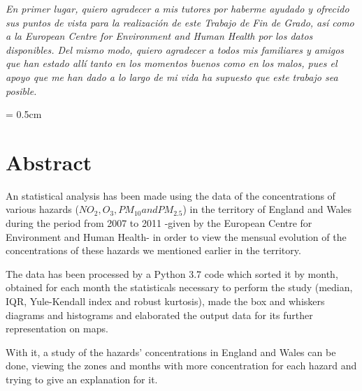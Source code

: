 \documentclass[12pt]{article}
\begin{document}
\newpage
\vspace{10cm}
\newpage

\begin{minipage}[]{20cm}
\vspace{10cm}
\end{minipage}


\begin{flushright}
\normalsize \textit{En primer lugar, quiero agradecer a mis tutores por haberme ayudado y ofrecido sus puntos de vista para la realización de este Trabajo de Fin de Grado, así como a la European Centre for Environment and Human Health por los datos disponibles. Del mismo modo, quiero agradecer a todos mis familiares y amigos que han estado allí tanto en los momentos buenos como en los malos, pues el apoyo que me han dado a lo largo de mi vida ha supuesto que este trabajo sea posible.}
\end{flushright}

\parskip = 0.5cm
\newpage
\tableofcontents
\newpage
{}	%
\setcounter{page}{1}

\section*{Abstract}
%

\normalsize An statistical analysis has been made using the data of the concentrations of various hazards ($NO_2, O_3, PM_{10} and PM_{2.5}$) in the territory of England and Wales during the period from 2007 to 2011 -given by the European Centre for Environment and Human Health- in order to view the mensual evolution of the concentrations of these hazards we mentioned earlier in the territory.

The data has been processed by a Python 3.7 code which sorted it by month, obtained for each month the statisticals necessary to perform the study (median, IQR, Yule-Kendall index and robust kurtosis), made the box and whiskers diagrams and histograms and elaborated the output data for its further representation on maps.

With it, a study of the hazards' concentrations in England and Wales can be done, viewing the zones and months with more concentration for each hazard and trying to give an explanation for it.

\vspace{0.5cm}
\end{document}
